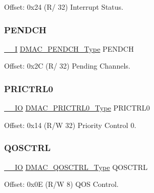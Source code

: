 Offset\+: 0x24 (R/ 32) Interrupt Status. 

\mbox{\label{struct_dmac_acf69858689aba40deb2d58ae55bd0006}} 
\subsubsection{\texorpdfstring{PENDCH}{PENDCH}}
{\footnotesize\ttfamily \mbox{\hyperlink{core__cm0plus_8h_af63697ed9952cc71e1225efe205f6cd3}{\+\_\+\+\_\+I}} \mbox{\hyperlink{union_d_m_a_c___p_e_n_d_c_h___type}{D\+M\+A\+C\+\_\+\+P\+E\+N\+D\+C\+H\+\_\+\+Type}} P\+E\+N\+D\+CH}



Offset\+: 0x2C (R/ 32) Pending Channels. 

\mbox{\label{struct_dmac_a68268a89356b2aa69cc5fdac65c4cdff}} 
\subsubsection{\texorpdfstring{PRICTRL0}{PRICTRL0}}
{\footnotesize\ttfamily \mbox{\hyperlink{core__cm0plus_8h_aec43007d9998a0a0e01faede4133d6be}{\+\_\+\+\_\+\+IO}} \mbox{\hyperlink{union_d_m_a_c___p_r_i_c_t_r_l0___type}{D\+M\+A\+C\+\_\+\+P\+R\+I\+C\+T\+R\+L0\+\_\+\+Type}} P\+R\+I\+C\+T\+R\+L0}



Offset\+: 0x14 (R/W 32) Priority Control 0. 

\mbox{\label{struct_dmac_a421b7353ef375d478b4f09ca5d74f2df}} 
\subsubsection{\texorpdfstring{QOSCTRL}{QOSCTRL}}
{\footnotesize\ttfamily \mbox{\hyperlink{core__cm0plus_8h_aec43007d9998a0a0e01faede4133d6be}{\+\_\+\+\_\+\+IO}} \mbox{\hyperlink{union_d_m_a_c___q_o_s_c_t_r_l___type}{D\+M\+A\+C\+\_\+\+Q\+O\+S\+C\+T\+R\+L\+\_\+\+Type}} Q\+O\+S\+C\+T\+RL}



Offset\+: 0x0E (R/W 8) Q\+OS Control. 

\mbox{\label{struct_dmac_a092866123ac46d0985136e4dca2f36f4}} 
